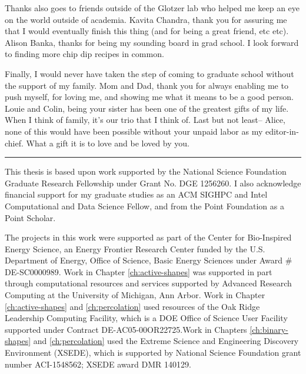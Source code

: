 Thanks also goes to friends outside of the Glotzer lab who helped me keep an eye on the world outside of academia.
Kavita Chandra, thank you for assuring me that I would eventually finish this thing (and for being a great friend, etc etc).
Alison Banka, thanks for being my sounding board in grad school. I look forward to finding more chip dip recipes in common.

Finally, I would never have taken the step of coming to graduate school without the support of my family.
Mom and Dad, thank you for always enabling me to push myself, for loving me, and showing me what it means to be a good person.
Louie and Colin, being your sister has been one of the greatest gifts of my life. When I think of family, it's our trio that I think of.
Last but not least-- Alice, none of this would have been possible without your unpaid labor as my editor-in-chief. What a gift it is to love and be loved by you.

\begin{center}\rule{5in}{1pt}\end{center}

This thesis is based upon work supported by the National Science Foundation Graduate Research Fellowship under Grant No. DGE 1256260.
I also acknowledge financial support for my graduate studies as an ACM SIGHPC and Intel Computational and Data Science Fellow, and from the Point Foundation as a Point Scholar.

The projects in this work were supported as part of the Center for Bio-Inspired Energy Science, an Energy Frontier Research Center funded by the U.S. Department of Energy, Office of Science, Basic Energy Sciences under Award \# DE-SC0000989.
Work in Chapter \ref{ch:active-shapes} was supported in part through computational resources and services supported by Advanced Research Computing at the University of Michigan, Ann Arbor.
Work in Chapter \ref{ch:active-shapes} and \ref{ch:percolation} used resources of the Oak Ridge Leadership Computing Facility, which is a DOE Office of Science User Facility supported under Contract DE-AC05-00OR22725.Work in Chapters \ref{ch:binary-shapes} and \ref{ch:percolation} used the Extreme Science and Engineering Discovery Environment (XSEDE), which is supported by National Science Foundation grant number ACI-1548562; XSEDE award DMR 140129.\cite{XSEDE}
